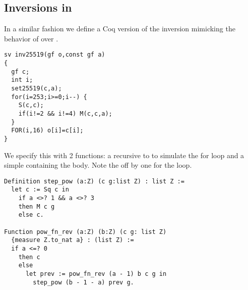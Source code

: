 \subsection{Inversions in \Zfield}

In a similar fashion we define a Coq version of the inversion mimicking
the behavior of  over .
\begin{lstlisting}[language=Ctweetnacl]
sv inv25519(gf o,const gf a)
{
  gf c;
  int i;
  set25519(c,a);
  for(i=253;i>=0;i--) {
    S(c,c);
    if(i!=2 && i!=4) M(c,c,a);
  }
  FOR(i,16) o[i]=c[i];
}
\end{lstlisting}
We specify this with 2 functions: a recursive  to to simulate the for loop and a simple
 containing the body. Note the off by one for the loop.
\begin{lstlisting}[language=Coq]
Definition step_pow (a:Z) (c g:list Z) : list Z :=
  let c := Sq c in
    if a <>? 1 && a <>? 3
    then M c g
    else c.

Function pow_fn_rev (a:Z) (b:Z) (c g: list Z)
  {measure Z.to_nat a} : (list Z) :=
  if a <=? 0
    then c
    else
      let prev := pow_fn_rev (a - 1) b c g in
        step_pow (b - 1 - a) prev g.
\end{lstlisting}

